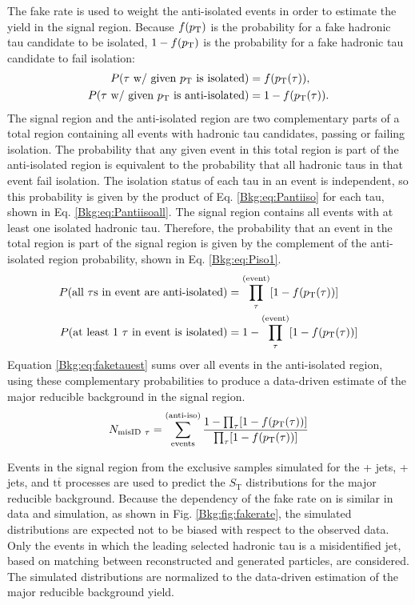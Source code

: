 \documentclass[12pt]{thesis}  %
\renewcommand{\ttbar}{\ensuremath{\mathrm{t}\overline{\mathrm{t}}}\xspace}
\def\ST{\ensuremath{S_{\text{T}}}\xspace}
\begin{document}
The fake rate is used to weight the anti-isolated events in order to estimate the yield in the signal region. Because $f(p_{\mathrm{T}})$ is the probability for a fake hadronic tau candidate to be isolated, $1-f(p_{\mathrm{T}})$ is the probability for a fake hadronic tau candidate to fail isolation:
\begin{align}
P(\tau\text{ w/ given \pt is isolated}) &= f(\pt(\tau)), \\
P(\tau\text{ w/ given \pt is anti-isolated}) &= 1 - f(\pt(\tau)). \label{Bkg:eq:Pantiiso}
\end{align}
The signal region and the anti-isolated region are two complementary parts of a total region containing all events with hadronic tau candidates, passing or failing isolation. The probability that any given event in this total region is part of the anti-isolated region is equivalent to the probability that all hadronic taus in that event fail isolation. The isolation status of each tau in an event is independent, so this probability is given by the product of Eq. \eqref{Bkg:eq:Pantiiso} for each tau, shown in Eq. \eqref{Bkg:eq:Pantiisoall}. The signal region contains all events with at least one isolated hadronic tau. Therefore, the probability that an event in the total region is part of the signal region is given by the complement of the anti-isolated region probability, shown in Eq. \eqref{Bkg:eq:Piso1}.
\begin{align}
P(\text{all }\tau\text{s in event are anti-isolated}) &= \prod_{\tau}^{\text{(event)}}[1-f(p_{\mathrm{T}}(\tau))] \label{Bkg:eq:Pantiisoall} \\
P(\text{at least 1 }\tau\text{ in event is isolated}) &= 1-\prod_{\tau}^{\text{(event)}}[1-f(p_{\mathrm{T}}(\tau))] \label{Bkg:eq:Piso1}
\end{align}
Equation \eqref{Bkg:eq:faketauest} sums over all events in the anti-isolated region, using these complementary probabilities to produce a data-driven estimate of the major reducible background in the signal region.
\begin{equation} N_{\text{misID}~\tau} = \sum_{\text{events}}^{\text{(anti-iso)}} \frac{1 - \prod_{\tau}[1-f(p_{\mathrm{T}}(\tau))]}{\prod_{\tau}[1-f(p_{\mathrm{T}}(\tau))]} \label{Bkg:eq:faketauest} \end{equation}

Events in the signal region from the exclusive samples simulated for the \W + jets, \Z + jets, and \ttbar processes are used to predict the \ST distributions for the major reducible background. Because the dependency of the fake rate on \pt is similar in data and simulation, as shown in Fig. \ref{Bkg:fig:fakerate}, the simulated distributions are expected not to be biased with respect to the observed data. Only the events in which the leading selected hadronic tau is a misidentified jet, based on matching between reconstructed and generated particles, are considered. The simulated distributions are normalized to the data-driven estimation of the major reducible background yield.
\end{document}

